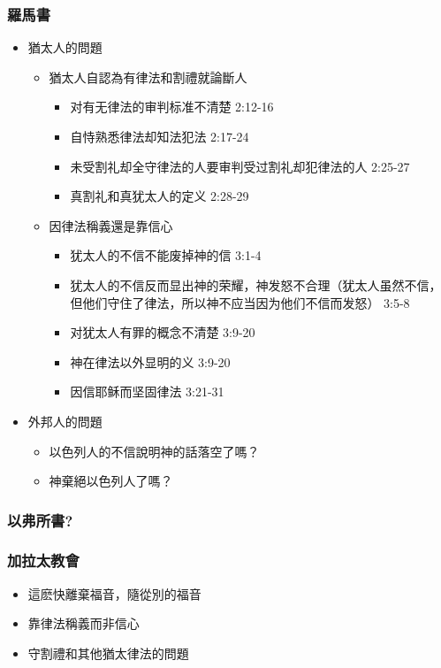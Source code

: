 \subsubsection{羅馬書}
\begin{itemize}%
\itemsep-.25em 
\item 猶太人的問題
\begin{itemize}%
\itemsep-.25em 
\item 猶太人自認為有律法和割禮就論斷人 

\begin{itemize}%
\itemsep-.25em 
\item 对有无律法的审判标准不清楚 2:12-16
\item 自恃熟悉律法却知法犯法 2:17-24
\item 未受割礼却全守律法的人要审判受过割礼却犯律法的人 2:25-27
\item 真割礼和真犹太人的定义 2:28-29
\end{itemize}

\item 因律法稱義還是靠信心 
\begin{itemize}%
\itemsep-.25em
\item 犹太人的不信不能废掉神的信 3:1-4
\item 犹太人的不信反而显出神的荣耀，神发怒不合理（犹太人虽然不信，但他们守住了律法，所以神不应当因为他们不信而发怒） 3:5-8
\item 对犹太人有罪的概念不清楚 3:9-20 
\item 神在律法以外显明的义 3:9-20 
\item 因信耶稣而坚固律法 3:21-31
\end{itemize}
\end{itemize}

\item 外邦人的問題
\begin{itemize}%
\itemsep-.25em 
\item 以色列人的不信說明神的話落空了嗎？
\item 神棄絕以色列人了嗎？ 
\end{itemize}
\end{itemize}

\subsubsection{以弗所書?}


\subsubsection{加拉太教會}
\begin{itemize}
\itemsep-.5em 
\item 這麽快離棄福音，隨從別的福音
\item 靠律法稱義而非信心
\item 守割禮和其他猶太律法的問題
\end{itemize}


